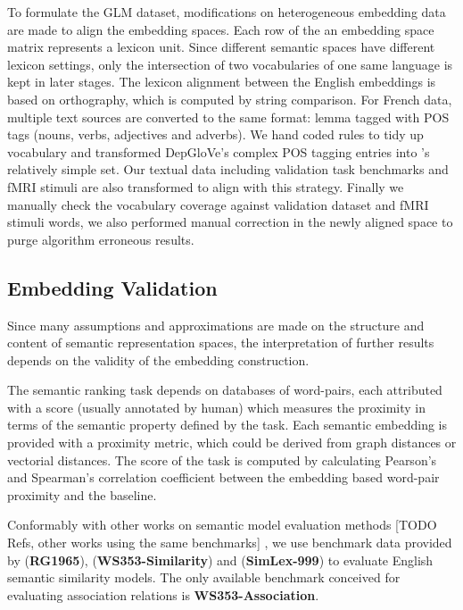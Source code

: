 To formulate the GLM dataset, modifications on heterogeneous embedding data are made to align the embedding spaces. Each row of the an embedding space matrix represents a lexicon unit. Since different semantic spaces have different lexicon settings, only the intersection of two vocabularies of one same language is kept in later stages. The lexicon alignment between the English embeddings is based on orthography, which is computed by string comparison. For French data, multiple text sources are converted to the same format: lemma tagged with  POS tags (nouns, verbs, adjectives and adverbs). We hand coded rules to tidy up  vocabulary and transformed DepGloVe's complex POS tagging entries into 's relatively simple set. Our textual data including validation task benchmarks and fMRI stimuli are also transformed to align with this strategy. Finally we manually check the vocabulary coverage against validation dataset and fMRI stimuli words, we also performed manual correction in the newly aligned space to purge algorithm erroneous results.  %

\subsection{Embedding Validation}

Since many assumptions and approximations are made on the structure and content of semantic representation spaces, the interpretation of further results depends on the validity of the embedding construction.

The semantic ranking task depends on databases of word-pairs, each attributed with a score (usually annotated by human) which measures the proximity in terms of the semantic property defined by the task. Each semantic embedding is provided with a proximity metric, which could be derived from graph distances or vectorial distances. The score of the task is computed by calculating Pearson's and Spearman's correlation coefficient  between the embedding based word-pair proximity and the baseline. 

Conformably with other works on semantic model evaluation methods [TODO Refs, other works using the same benchmarks] \parencite{saediWordNetEmbeddings2018}, we use benchmark data provided by \textcite{rubensteinContextualCorrelatesSynonymy1965} (\textbf{RG1965}), \textcite{agirreStudySimilarityRelatedness2009} (\textbf{WS353-Similarity}) and \textcite{hillSimLex999EvaluatingSemantic2015} (\textbf{SimLex-999}) to evaluate English semantic similarity models. The only available benchmark conceived for evaluating association relations is \textbf{WS353-Association}.

